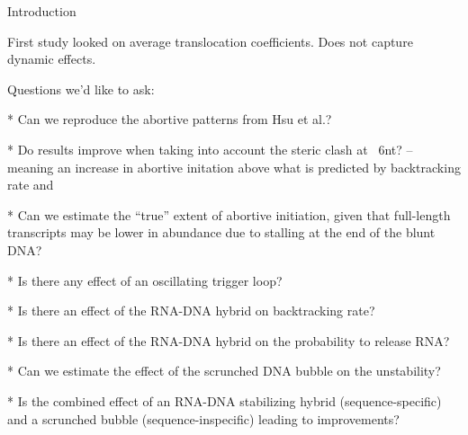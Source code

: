 Introduction

First study looked on average translocation coefficients. Does not capture
dynamic effects.

Questions we'd like to ask:

* Can we reproduce the abortive patterns from Hsu et al.?

* Do results improve when taking into account the steric clash at ~6nt?
    -- meaning an increase in abortive initation above what is predicted by
    backtracking rate and 

* Can we estimate the ``true'' extent of abortive initiation, given that
  full-length transcripts may be lower in abundance due to stalling at the end of
  the blunt DNA?

* Is there any effect of an oscillating trigger loop?

* Is there an effect of the RNA-DNA hybrid on backtracking rate?

* Is there an effect of the RNA-DNA hybrid on the probability to release RNA?

* Can we estimate the effect of the scrunched DNA bubble on the unstability?

* Is the combined effect of an RNA-DNA stabilizing hybrid (sequence-specific)
  and a scrunched bubble (sequence-inspecific) leading to improvements?
